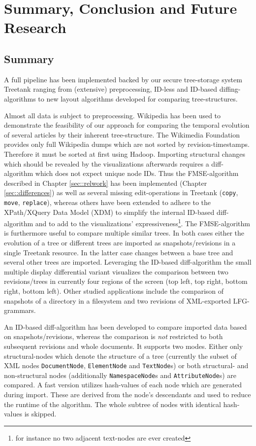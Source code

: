 \section{Summary, Conclusion and Future Research}\label{sec::conclusion}
\subsection{Summary}
A full pipeline has been implemented backed by our secure tree-storage system Treetank ranging from (extensive) preprocessing, ID-less and ID-based diffing-algorithms to new layout algorithms developed for comparing tree-structures.

Almost all data is subject to preprocessing. Wikipedia has been used to demonstrate the feasibility of our approach for comparing the temporal evolution of several articles by their inherent tree-structure. The Wikimedia Foundation provides only full Wikipedia dumps which are not sorted by revision-timestamps. Therefore it must be sorted at first using Hadoop. Importing structural changes which should be revealed by the visualizations afterwards requires a diff-algorithm which does not expect unique node IDs. Thus the FMSE-algorithm described in Chapter \ref{sec::relwork} has been implemented (Chapter \ref{sec::differences}) as well as several missing edit-operations in Treetank (\texttt{copy}, \texttt{move}, \texttt{replace}), whereas others have been extended to adhere to the XPath/XQuery Data Model (XDM) to simplify the internal ID-based diff-algorithm and to add to the visualizations' expressiveness\footnote{for instance no two adjacent text-nodes are ever created}. The FMSE-algorithm is furthermore useful to compare multiple similar trees. In both cases either the evolution of a tree or different trees are imported as snapshots/revisions in a single Treetank resource. In the latter case changes between a base tree and several other trees are imported. Leveraging the ID-based diff-algorithm the small multiple display differential variant visualizes the comparison between two revisions/trees in currently four regions of the screen (top left, top right, bottom right, bottom left). Other studied applications include the comparison of snapshots of a directory in a filesystem and two revisions of XML-exported LFG-grammars.

An ID-based diff-algorithm has been developed to compare imported data based on snapshots/revisions, whereas the comparison is \emph{not} restricted to both subsequent revisions and whole documents. It supports two modes. Either only structural-nodes which denote the structure of a tree (currently the subset of XML nodes \texttt{DocumentNode}, \texttt{ElementNode} and \texttt{TextNode}s) or both structural- and non-structural nodes (additionally \texttt{NamespaceNode}s and \texttt{AttributeNode}s) are compared. A fast version utilizes hash-values of each node which are generated during import. These are derived from the node's descendants and used to reduce the runtime of the algorithm. The whole subtree of nodes with identical hash-values is skipped.

